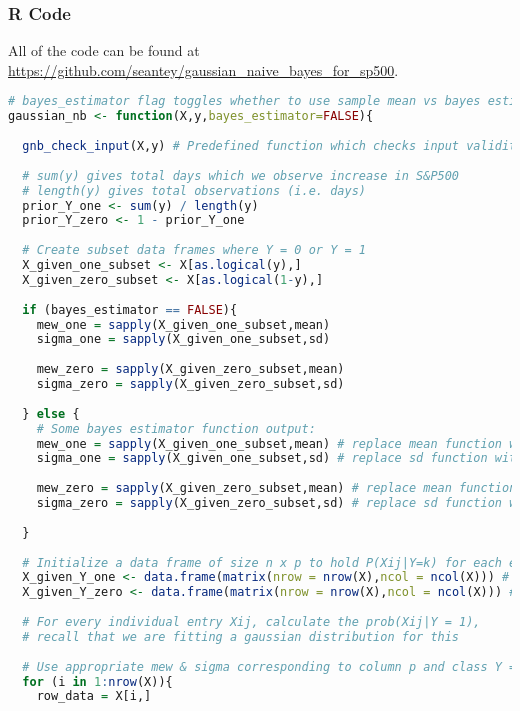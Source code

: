 \documentclass{article}
\begin{document}
\newpage

\subsubsection{R Code}

All of the code can be found at \url{https://github.com/seantey/gaussian_naive_bayes_for_sp500}.

\begin{lstlisting}[language=R]
# bayes_estimator flag toggles whether to use sample mean vs bayes estimator
gaussian_nb <- function(X,y,bayes_estimator=FALSE){
  
  gnb_check_input(X,y) # Predefined function which checks input validity
  
  # sum(y) gives total days which we observe increase in S&P500
  # length(y) gives total observations (i.e. days)
  prior_Y_one <- sum(y) / length(y)
  prior_Y_zero <- 1 - prior_Y_one 
  
  # Create subset data frames where Y = 0 or Y = 1 
  X_given_one_subset <- X[as.logical(y),]
  X_given_zero_subset <- X[as.logical(1-y),]
    
  if (bayes_estimator == FALSE){
    mew_one = sapply(X_given_one_subset,mean)
    sigma_one = sapply(X_given_one_subset,sd)
    
    mew_zero = sapply(X_given_zero_subset,mean)
    sigma_zero = sapply(X_given_zero_subset,sd)
    
  } else {
    # Some bayes estimator function output:
    mew_one = sapply(X_given_one_subset,mean) # replace mean function with something else!
    sigma_one = sapply(X_given_one_subset,sd) # replace sd function with something else!
    
    mew_zero = sapply(X_given_zero_subset,mean) # replace mean function with something else!
    sigma_zero = sapply(X_given_zero_subset,sd) # replace sd function with something else!
    
  }  
  
  # Initialize a data frame of size n x p to hold P(Xij|Y=k) for each entry of matrix X
  X_given_Y_one <- data.frame(matrix(nrow = nrow(X),ncol = ncol(X))) # Y = 1
  X_given_Y_zero <- data.frame(matrix(nrow = nrow(X),ncol = ncol(X))) # Y = 0 
  
  # For every individual entry Xij, calculate the prob(Xij|Y = 1), 
  # recall that we are fitting a gaussian distribution for this
  
  # Use appropriate mew & sigma corresponding to column p and class Y = k
  for (i in 1:nrow(X)){
    row_data = X[i,] 
    

\end{lstlisting}
\end{document}
